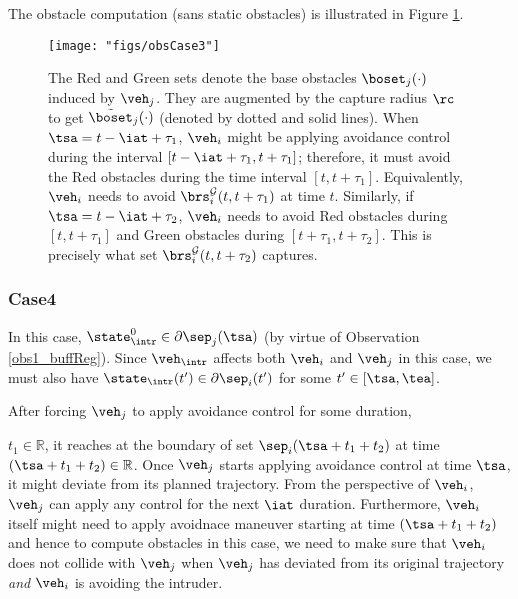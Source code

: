 The obstacle computation (sans static obstacles) is illustrated in Figure \ref{fig:obsCase3}.
\begin{figure}[H]
  \centering
  \texttt{[image: "figs/obsCase3"]}
  \caption{The Red and Green sets denote the base obstacles $\boset_j(\cdot)$ induced by $\veh_j$. They are augmented by the capture radius $\rc$ to get $\tilde{\boset}_j(\cdot)$ (denoted by dotted and solid lines). When $\tsa = t - \iat + \tau_1$, $\veh_i$ might be applying avoidance control during the interval $[t - \iat + \tau_1, t + \tau_1]$; therefore, it must avoid the Red obstacles during the time interval $[t, t + \tau_1]$. Equivalently, $\veh_i$ needs to avoid $\brs^{\mathcal{G}}_{i}(t, t+\tau_1)$ at time $t$. Similarly, if $\tsa = t - \iat + \tau_2$, $\veh_i$ needs to avoid Red obstacles during $[t, t + \tau_1]$ and Green obstacles during $[t + \tau_1, t + \tau_2]$. This is precisely what set $\brs^{\mathcal{G}}_{i}(t, t+\tau_2)$ captures.}
  \label{fig:obsCase3}
\end{figure}

\subsubsection{Case4} \label{sec:intruderObs_case4}
In this case, $\state_{\intr}^0 \in \partial\sep_j(\tsa)$ (by virtue of Observation \ref{obs1_buffReg}). Since $\veh_{\intr}$ affects both $\veh_i$ and $\veh_j$ in this case, we must also have $\state_{\intr}(t') \in \partial\sep_i(t')$ for some $t' \in [\tsa, \tea]$.

After forcing $\veh_j$ to apply avoidance control for some duration, 

 $t_1 \in \mathbb{R}$, it reaches at the boundary of set $\sep_i(\tsa + t_1 + t_2)$ at time $(\tsa + t_1 + t_2) \in \mathbb{R}$. Once $\veh_j$ starts applying avoidance control at time $\tsa$, it might deviate from its planned trajectory. From the perspective of $\veh_i$, $\veh_j$ can apply any control for the next $\iat$ duration. Furthermore, $\veh_i$ itself might need to apply avoidnace maneuver starting at time $(\tsa + t_1 + t_2)$ and hence to compute obstacles in this case, we need to make sure that $\veh_i$ does not collide with $\veh_j$ when $\veh_j$ has deviated from its original trajectory \textit{and} $\veh_i$ is avoiding the intruder.   

